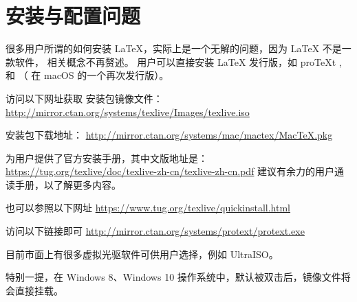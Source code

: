 %
%
%
%

\section{安装与配置问题}
\label{sec:install}



很多用户所谓的如何安装 \LaTeX{}，实际上是一个无解的问题，因为 \LaTeX{} 不是一款软件，
相关概念不再赘述。
用户可以直接安装 LaTeX 发行版，如 proTeXt , \TeXLive{} 和 \MacTeX{}
（\TeXLive{} 在 macOS 的一个再次发行版）。



访问以下网址获取 \TeXLive{} 安装包镜像文件：
\url{http://mirror.ctan.org/systems/texlive/Images/texlive.iso}

\MacTeX{} 安装包下载地址：
\url{http://mirror.ctan.org/systems/mac/mactex/MacTeX.pkg}



\TeXLive{} 为用户提供了官方安装手册，其中文版地址是：
\url{https://tug.org/texlive/doc/texlive-zh-cn/texlive-zh-cn.pdf}
建议有余力的用户通读手册，以了解更多内容。

也可以参照以下网址 \url{https://www.tug.org/texlive/quickinstall.html}



访问以下链接即可 \url{http://mirror.ctan.org/systems/protext/protext.exe}



目前市面上有很多虚拟光驱软件可供用户选择，例如 UltraISO。

特别一提，在 Windows 8、Windows 10
操作系统中，默认被双击后，镜像文件将会直接挂载。

